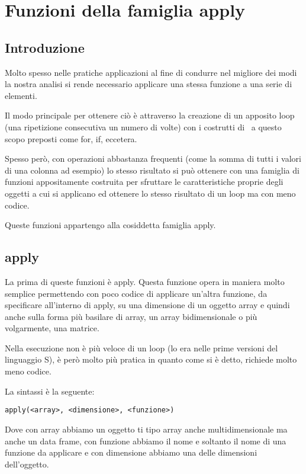 \chapter{Funzioni della famiglia apply}
\section{Introduzione}

Molto spesso nelle pratiche applicazioni  al fine di condurre nel migliore dei modi la nostra analisi si rende necessario applicare una stessa funzione a una serie di elementi.

Il modo principale per ottenere ciò è attraverso la creazione di un apposito loop (una ripetizione consecutiva un numero di volte) con i costrutti di \erre\ a questo scopo preposti come \textsf{for}, \textsf{if}, eccetera.

Spesso però, con operazioni abbastanza frequenti (come la somma di tutti i valori di una colonna ad esempio) lo stesso risultato si può ottenere con una famiglia di funzioni appositamente costruita per sfruttare le caratteristiche proprie degli oggetti a cui si applicano ed ottenere lo stesso risultato di un loop ma con meno codice.

Queste funzioni appartengo alla cosiddetta famiglia \textsf{apply}.

\section{apply}
La prima di queste funzioni è \textsf{apply}. Questa funzione opera in maniera molto semplice permettendo con poco codice di applicare un'altra funzione, da specificare all'interno di \textsf{apply}, su una dimensione di un oggetto array e quindi anche sulla forma più basilare di array, un array bidimensionale o più volgarmente, una matrice.

Nella esecuzione non è più veloce di un loop (lo era nelle prime versioni del linguaggio \textsf{S}), è però molto più pratica in quanto come si è detto, richiede molto meno codice.

La sintassi è la seguente:
\begin{lstlisting}
apply(<array>, <dimensione>, <funzione>)
\end{lstlisting}

Dove con array abbiamo un oggetto ti tipo array anche multidimensionale ma anche un data frame, con funzione abbiamo il nome e soltanto il nome di una funzione da applicare e con dimensione abbiamo una delle dimensioni dell'oggetto.

